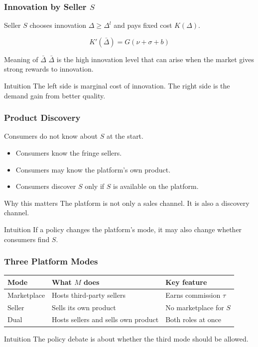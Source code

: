 \begin{frame}
  \frametitle{Innovation by Seller $S$}
  \small
  Seller $S$ chooses innovation $\Delta \geq \Delta^l$ and pays fixed cost $K(\Delta)$.

  \begin{equation*}
    K'(\bar{\Delta}) = G(\nu+\sigma+b)
  \end{equation*}

  \begin{block}{Meaning of $\bar{\Delta}$}
    $\bar{\Delta}$ is the high innovation level that can arise when the market gives strong rewards to innovation.
  \end{block}

  \begin{alertblock}{Intuition}
    The left side is marginal cost of innovation. The right side is the demand gain from better quality.
  \end{alertblock}
\end{frame}

\begin{frame}
  \frametitle{Product Discovery}
  \small
  Consumers do not know about $S$ at the start.

  \begin{itemize}
    \item Consumers know the fringe sellers.
    \item Consumers may know the platform's own product.
    \item Consumers discover $S$ only if $S$ is available on the platform.
  \end{itemize}

  \begin{block}{Why this matters}
    The platform is not only a sales channel. It is also a discovery channel.
  \end{block}

  \begin{alertblock}{Intuition}
    If a policy changes the platform's mode, it may also change whether consumers find $S$.
  \end{alertblock}
\end{frame}

\begin{frame}
  \frametitle{Three Platform Modes}
  \small
  \begin{center}
    \begin{tabular}{lll}
      \toprule
      Mode & What $M$ does & Key feature \\
      \midrule
      Marketplace & Hosts third-party sellers & Earns commission $\tau$ \\
      Seller & Sells its own product & No marketplace for $S$ \\
      Dual & Hosts sellers and sells own product & Both roles at once \\
      \bottomrule
    \end{tabular}
  \end{center}

  \begin{block}{Intuition}
    The policy debate is about whether the third mode should be allowed.
  \end{block}
\end{frame}

